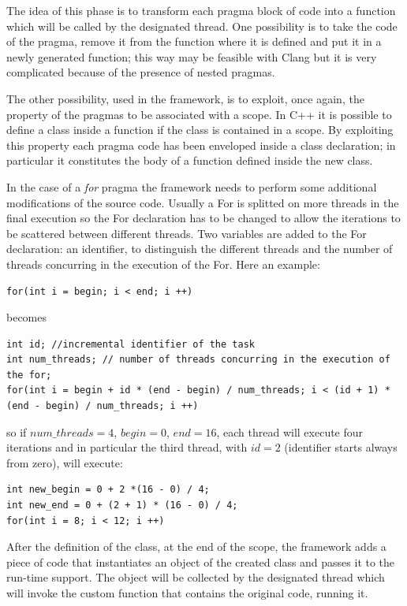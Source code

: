 \documentclass[a4paper,11pt,oneside]{book}
\begin{document}
The idea of this phase is to transform each pragma block of code into a function which will be called by the designated thread. One possibility is to take the code of the pragma, remove it from the function where it is defined and put it in a newly generated function; this way may be feasible with Clang but it is very complicated because of the presence of nested pragmas. 

The other possibility, used in the framework, is to exploit, once again, the property of the pragmas to be associated with a scope. In C++ it is possible to define a class inside a function if the class is contained in a scope. By exploiting this property each pragma code has been enveloped inside a class declaration; in particular it constitutes the body of a function defined inside the new class.

In the case of a \emph{for} pragma the framework needs to perform some additional modifications of the source code. Usually a For is splitted on more threads in the final execution so the For declaration has to be changed to allow the iterations to be scattered between different threads. Two variables are added to the For declaration: an identifier, to distinguish the different threads and the number of threads concurring in the execution of the For. Here an example:

\begin{lstlisting}[language=CCC]
for(int i = begin; i < end; i ++)
\end{lstlisting}
becomes

\begin{lstlisting}[language=CCC]
int id; //incremental identifier of the task
int num_threads; // number of threads concurring in the execution of the for;
for(int i = begin + id * (end - begin) / num_threads; i < (id + 1) * (end - begin) / num_threads; i ++)
\end{lstlisting}
so if $num\_threads  = 4$, $begin = 0$, $end = 16$, each thread will execute four iterations and in particular the third thread, with $id = 2$ (identifier starts always from zero), will execute:
\begin{lstlisting}[language=CCC]
int new_begin = 0 + 2 *(16 - 0) / 4;
int new_end = 0 + (2 + 1) * (16 - 0) / 4;
for(int i = 8; i < 12; i ++)
\end{lstlisting}

After the definition of the class, at the end of the scope, the framework adds a piece of code that instantiates an object of the created class and passes it to the run-time support. The object will be collected by the designated thread which will invoke the custom function that contains the original code, running it. 
\end{document}
